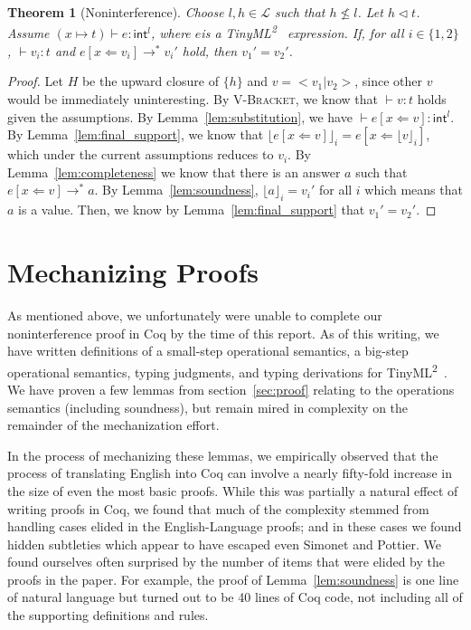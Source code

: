 \documentclass[a4paper,twocolumn]{article}
\newcommand{\langName}[0]{TinyML\textsuperscript{2}~}
\newcommand{\typeRule}[3]{#1 \vdash #2 \colon #3}
\newcommand{\guards}[0]{\lhd}
\newcommand{\lift}[1]{\lfloor #1 \rfloor}
\theoremstyle{plain}
\newtheorem{thm}{Theorem}
\theoremstyle{definition}
\begin{document}
\begin{thm}[Noninterference]
  Choose $l, h \in \mathcal{L}$ such that $h \not\leq l$.  Let $h \guards t$.
  Assume $\typeRule{(x \mapsto t)}{e}{\textsf{int}^l}$, where $e$is a \langName
  expression.  If, for all $i \in \{1, 2\}$, $\typeRule{ }{v_i}{t}$ and $e[x
  \Leftarrow v_i] \to^* v_i'$ hold, then $v_1' = v_2'$.
\end{thm}
\begin{proof}
  Let $H$ be the upward closure of $\{h\}$ and $v = < v_1 | v_2 >$, since other
  $v$ would be immediately uninteresting.  By \textsc{V-Bracket}, we know that
  $\typeRule{ }{v}{t}$ holds given the assumptions.
  By Lemma~\ref{lem:substitution}, we have $\typeRule{ }{e[x \Leftarrow
  v]}{\textsf{int}^l}$.  By Lemma~\ref{lem:final_support}, we know that
  $\lift{e[x \Leftarrow v]}_i = e[x \Leftarrow \lift{v}_i]$, which under the
  current assumptions reduces to $v_i$.  By Lemma~\ref{lem:completeness} we know
  that there is an answer $a$ such that $e[x \Leftarrow v] \to^* a$.  By
  Lemma~\ref{lem:soundness}, $\lift{a}_i = v_i'$ for all $i$ which means that
  $a$ is a value.  Then, we know by Lemma~\ref{lem:final_support} that $v_1' =
  v_2'$.
\end{proof}

\section{Mechanizing Proofs}
\label{sec:mechanizing}

As mentioned above, we unfortunately were unable to complete our noninterference
proof in Coq by the time of this report.  As of this writing, we have written definitions of a small-step operational semantics, a big-step operational semantics, typing judgments, and typing derivations for \langName.  We have proven a few lemmas from section~\ref{sec:proof} relating to the operations semantics (including soundness), but remain mired in complexity on the remainder of the mechanization effort.  

In the process of mechanizing these lemmas, we empirically observed that the process of translating English into Coq can involve a nearly fifty-fold increase in the size of even the most basic proofs.  While this was partially a natural effect of writing proofs in Coq, we found that much of the complexity stemmed from handling cases elided in the English-Language proofs; and in these cases we found hidden subtleties which appear to have escaped even Simonet and Pottier. We found ourselves
often surprised by the number of items that were elided by the proofs in the
paper.  For example, the proof of Lemma~\ref{lem:soundness} is one line of
natural language but turned out to be 40 lines of Coq code, not including all of
the supporting definitions and rules.
\end{document}
